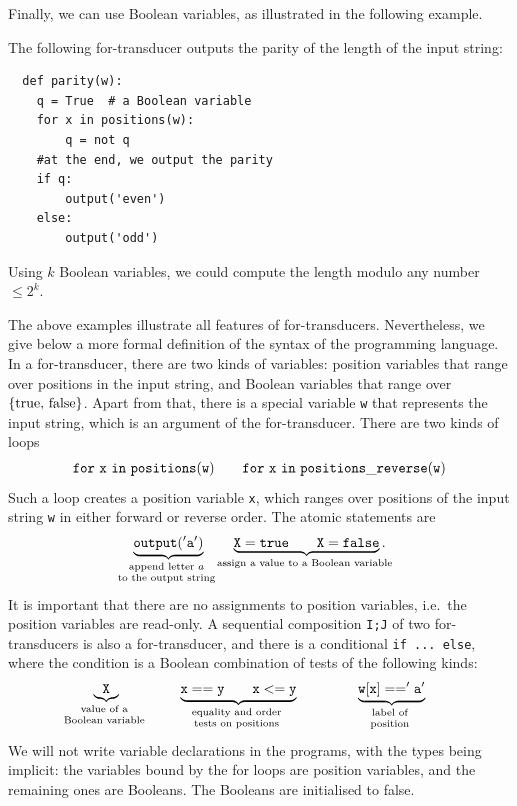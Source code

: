 Finally, we can use Boolean variables, as illustrated in the following example. 

\begin{myexample}[Parity]\label{ex:parity-for-transducer}
    The following for-transducer outputs the parity of the length of the  input string:
    \begin{lstlisting}
  def parity(w):
    q = True  # a Boolean variable
    for x in positions(w):
        q = not q
    #at the end, we output the parity
    if q:
        output('even')
    else:
        output('odd')
\end{lstlisting}
Using $k$ Boolean variables, we could compute the length modulo any number $\le 2^k$.
\end{myexample}


The above examples illustrate all features of for-transducers. Nevertheless, we give below a more formal definition of the syntax of the programming language. In a for-transducer, there  are two kinds of variables: position variables that range over positions in the input string, and Boolean variables that range over $\{\text{true, false}\}$.   Apart from that, there is a special variable {\tt w} that represents the input string, which is an argument of the for-transducer.
There are  two kinds of loops 
\begin{eqnarray*}
    {\tt for\ x\ in\  positions(w)} \qquad {\tt for\ x\ in\ positions\_reverse(w)}
\end{eqnarray*}
Such a loop creates a position variable {\tt x}, which ranges over positions of the input string {\tt w} in either forward or reverse order. The atomic statements are 
\begin{eqnarray*}
   \myunderbrace{{\tt output('a')}}{append letter $a$ \\ \scriptsize to the output string} \qquad 
   \myunderbrace{{\tt X = true} \qquad {\tt X = false}}{assign a value to a Boolean variable}.
\end{eqnarray*}
It is important that there are no assignments to position variables, i.e.~the position variables are read-only.
A sequential composition {\tt I;J} of two for-transducers is also a for-transducer, and there is a conditional {\tt if ... else}, where  the condition is a Boolean combination of tests of the following kinds:
\begin{align*}
\myunderbrace{{\tt X}}{value of a\\ \scriptsize
 Boolean variable} \hspace{1.5cm} 
 \myunderbrace{\tt x == \tt y \qquad \tt x <= \tt y }{equality and order  \\ \scriptsize  tests on positions}
 \hspace{1.5cm} 
 \myunderbrace{\mathtt{w[x] == 'a'}}{label of  \\  \scriptsize position}
\end{align*}
We will not write variable declarations in the programs, with the types being implicit: the variables bound by the for loops are  position variables, and the remaining ones are  Booleans. The Booleans are initialised to false.


